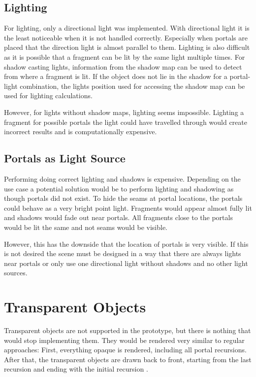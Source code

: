 \subsection{Lighting}
For lighting, only a directional light was implemented. With directional light it is the least noticeable when it is not handled correctly. Especially when portals are placed that the direction light is almost parallel to them.
Lighting is also difficult as it is possible that a fragment can be lit by the same light multiple times. For shadow casting lights, information from the shadow map can be used to detect from where a fragment is lit. If the object does not lie in the shadow for a portal-light combination, the lights position used for accessing the shadow map can be used for lighting calculations.

However, for lights without shadow maps, lighting seems impossible. Lighting a fragment for possible portals the light could have travelled through would create incorrect results and is computationally expensive. 


\subsection{Portals as Light Source}
\label{section:portalsaslights}
Performing doing correct lighting and shadows is expensive. Depending on the use case a potential solution would be to perform lighting and shadowing as though portals did not exist. To hide the seams at portal locations, the portals could behave as a very bright point light. Fragments would appear almost fully lit and shadows would fade out near portals. All fragments close to the portals would be lit the same and not seams would be visible.

However, this has the downside that the location of portals is very visible. If this is not desired the scene must be designed in a way that there are always lights near portals or only use one directional light without shadows and no other light sources.


\section{Transparent Objects}
Transparent objects are not supported in the prototype, but there is nothing that would stop implementing them. They would be rendered very similar to regular approaches: First, everything opaque is rendered, including all portal recursions. After that, the transparent objects are drawn back to front, starting from the last recursion and ending with the initial recursion \cite{lecture:portalProblems}.

